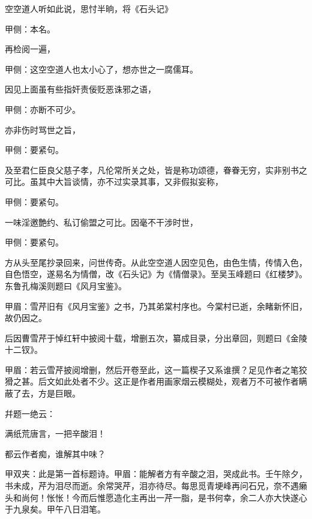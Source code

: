 \begin{parag}
    空空道人听如此说，思忖半晌，将《石头记》\begin{note}甲侧：本名。\end{note}再检阅一遍，\begin{note}甲侧：这空空道人也太小心了，想亦世之一腐儒耳。\end{note}因见上面虽有些指奸责佞贬恶诛邪之语，\begin{note}甲侧：亦断不可少。\end{note}亦非伤时骂世之旨，\begin{note}甲侧：要紧句。\end{note}及至君仁臣良父慈子孝，凡伦常所关之处，皆是称功颂德，眷眷无穷，实非别书之可比。虽其中大旨谈情，亦不过实录其事，又非假拟妄称，\begin{note}甲侧：要紧句。\end{note}一味淫邀艶约、私订偷盟之可比。因毫不干涉时世，\begin{note}甲侧：要紧句。\end{note}方从头至尾抄录回来，问世传奇。从此空空道人因空见色，由色生情，传情入色，自色悟空，遂易名为情僧，改《石头记》为《情僧录》。至吴玉峰题曰《红楼梦》。东鲁孔梅溪则题曰《风月宝鉴》。\begin{note}甲眉：雪芹旧有《风月宝鉴》之书，乃其弟棠村序也。今棠村已逝，余睹新怀旧，故仍因之。\end{note}后因曹雪芹于悼红轩中披阅十载，增删五次，纂成目录，分出章回，则题曰《金陵十二钗》。\begin{note}甲眉：若云雪芹披阅增删，然后开卷至此，这一篇楔子又系谁撰？足见作者之笔狡猾之甚。后文如此处者不少。这正是作者用画家烟云模糊处，观者万不可被作者瞒蔽了去，方是巨眼。\end{note}幷题一绝云：
\end{parag}


\begin{poem}
    \begin{pl}满纸荒唐言，一把辛酸泪！\end{pl}

    \begin{pl}都云作者痴，谁解其中味？\end{pl}
    \begin{note}甲双夹：此是第一首标题诗。甲眉：能解者方有辛酸之泪，哭成此书。壬午除夕，书未成，芹为泪尽而逝。余常哭芹，泪亦待尽。每思觅青埂峰再问石兄，奈不遇癞头和尚何！怅怅！今而后惟愿造化主再出一芹一脂，是书何幸，余二人亦大快遂心于九泉矣。甲午八日泪笔。\end{note}
\end{poem}


